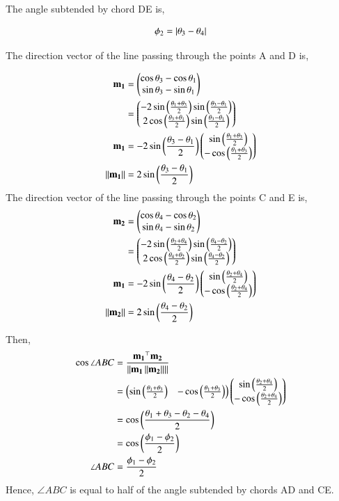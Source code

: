 \documentclass[journal,12pt,twocolumn]{IEEEtran}
\begin{document}
\begin{enumerate}
The angle subtended by chord DE is,

		\begin{align}
			\phi_2 = \left\vert\theta_3-\theta_4\right\vert
		\end{align}

The direction vector of the line passing through the points A and D is,

		\begin{align}
			\mathbf{m_1}&=\begin{pmatrix}\cos \theta_3-\cos \theta_1 \\ \sin \theta_3-\sin \theta_1\end{pmatrix}\\
			       &=\begin{pmatrix}-2\sin \left(\frac{\theta_1+\theta_3}{2}\right)\sin \left(\frac{\theta_3-\theta_1}{2}\right) \\ 2\cos \left(\frac{\theta_3+\theta_1}{2}\right) \sin \left(\frac{\theta_3-\theta_1}{2}\right)\end{pmatrix}\\
			\mathbf{m_1} &= -2\sin \left(\frac{\theta_3-\theta_1}{2}\right)\begin{pmatrix}\sin \left(\frac{\theta_1+\theta_3}{2}\right)\\-\cos \left(\frac{\theta_1+\theta_3}{2}\right)\end{pmatrix}\\ 
		\left\lVert\mathbf{m_1}\right\rVert &= 2\sin \left(\frac{\theta_3-\theta_1}{2}\right)
		\end{align}
The direction vector of the line passing through the points C and E is,
		\begin{align}
			\mathbf{m_2}&=\begin{pmatrix}\cos \theta_4-\cos \theta_2 \\ \sin \theta_4-\sin \theta_2\end{pmatrix}\\
			       &=\begin{pmatrix}-2\sin \left(\frac{\theta_2+\theta_4}{2}\right)\sin \left(\frac{\theta_4-\theta_2}{2}\right) \\ 2\cos \left(\frac{\theta_4+\theta_2}{2}\right) \sin \left(\frac{\theta_4-\theta_2}{2}\right)\end{pmatrix}\\
			\mathbf{m_1} &= -2\sin \left(\frac{\theta_4-\theta_2}{2}\right)\begin{pmatrix}\sin \left(\frac{\theta_2+\theta_4}{2}\right)\\-\cos \left(\frac{\theta_2+\theta_4}{2}\right)\end{pmatrix}\\ 
			\left\lVert\mathbf{m_2}\right\rVert&= 2\sin \left(\frac{\theta_4-\theta_2}{2}\right)
		\end{align}

Then,
		\begin{align}
			\cos \angle ABC &= \frac{\mathbf{m_1}^{\top}\mathbf{m_2}}{\left\lVert\mathbf{m_1}\left\lVert\mathbf{m_2}\right\rVert\right\rVert}\\
					&= \begin{pmatrix}\sin \left(\frac{\theta_1+\theta_3}{2}\right) & -\cos \left(\frac{\theta_1+\theta_3}{2}\right) \end{pmatrix} \begin{pmatrix}\sin \left(\frac{\theta_2+\theta_4}{2}\right) \\ -\cos \left(\frac{\theta_2+\theta_4}{2}\right) \end{pmatrix}\\								
					&= \cos \left(\frac{\theta_1+\theta_3-\theta_2-\theta_4}{2}\right)\\
					&= \cos \left(\frac{\phi_1-\phi_2}{2}\right)\\
			     \angle ABC &= \frac{\phi_1-\phi_2}{2}
		\end{align}	
Hence, $\angle ABC$ is equal to half of the angle subtended by chords AD and CE.

		\begin{table}[h]
			\centering
			
			\caption{}
			\label{tab:1}
		\end{table}

\end{enumerate}
\end{document}
